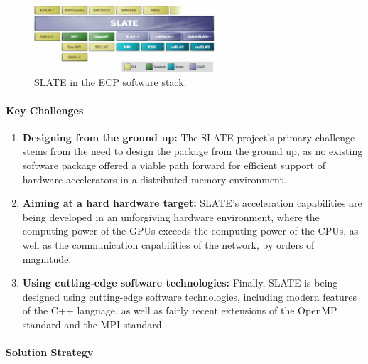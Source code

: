 \begin{figure}[htb]
    \centering
    \includegraphics[width=0.6\textwidth]{projects/2.3.3-MathLibs/2.3.3.09-SLATE/SLATE-architecture.jpg}
    \caption{\label{fig:slate-architecture}
    SLATE in the ECP software stack.}
\end{figure}

\paragraph{Key  Challenges}

\begin{enumerate}
\item
\textbf{Designing from the ground up:}
The SLATE project's primary challenge stems from the need to design the package
from the ground up, as no existing software package offered
a viable path forward for efficient support of hardware accelerators in
a distributed-memory environment.
\item
\textbf{Aiming at a hard hardware target:}
SLATE's acceleration capabilities are being developed in an unforgiving
hardware environment, where the computing power of the GPUs exceeds the computing
power of the CPUs, as well as the communication capabilities of the network,
by orders of magnitude.
\item
\textbf{Using cutting-edge software technologies:}
Finally, SLATE is being designed using cutting-edge software technologies,
including modern features of the C++
language, as well as fairly recent extensions of the OpenMP standard
and the MPI standard.
\end{enumerate}

\paragraph{Solution Strategy}


